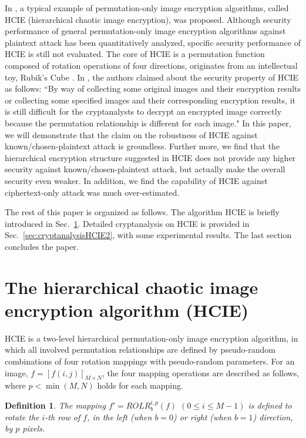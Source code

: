 \documentclass[final,3p,times,twocolumn]{elsarticle}
\newtheorem{definition}{Definition}
\begin{document}
In \cite{Yen-Guo:HCIE:IEEPVISP2000}, a typical example of permutation-only image encryption algorithms, called HCIE (hierarchical chaotic image encryption),
was proposed. Although security performance of general permutation-only image encryption algorithms against plaintext attack has been
quantitatively analyzed, specific security performance of HCIE is still not evaluated. The core of HCIE is a
permutation function composed of rotation operations of four directions, originates from an intellectual toy, Rubik's Cube \cite{Korf:Cube:97}.
In \cite{Yen-Guo:HCIE:IEEPVISP2000}, the authors claimed about the security property of HCIE as follows: ``By way of collecting some original images and their
encryption results or collecting some specified images and their corresponding encryption results, it is still difficult for
the cryptanalysts to decrypt an encrypted image correctly because the permutation relationship is different for each
image." In this paper, we will demonstrate that the claim on the robustness of HCIE against known/chosen-plaintext attack is groundless. Further more, we find that the hierarchical encryption structure suggested in HCIE does not provide any higher security against known/chosen-plaintext attack, but actually make
the overall security even weaker. In addition, we find the capability of HCIE against ciphertext-only attack was much over-estimated.

The rest of this paper is organized as follows. The algorithm HCIE is briefly introduced in Sec.~\ref{sec:HCIE}.
Detailed cryptanalysis on HCIE is provided in Sec.~\ref{sec:cryptanalysisHCIE2}, with some experimental results.
The last section concludes the paper.

\section{The hierarchical chaotic image encryption algorithm (HCIE)}
\label{sec:HCIE}

HCIE is a two-level hierarchical permutation-only image encryption algorithm, in which all involved permutation relationships are defined by pseudo-random
combinations of four rotation mappings with pseudo-random
parameters. For an image, $f=[f(i,j)]_{M\times N}$, the four
mapping operations are described as follows, where $p<\min(M,N)$
holds for each mapping.

\begin{definition}
The mapping $f'=ROLR^{i,p}_b(f)$ $(0\leq i\leq M-1)$ is defined to
rotate the $i$-th row of $f$, in the left (when $b=0$) or right
(when $b=1$) direction, by $p$ pixels.
\end{definition}
\end{document}
